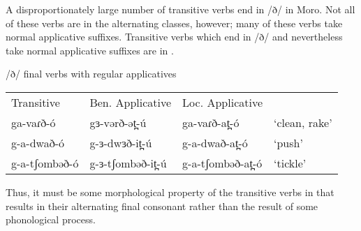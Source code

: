 
A disproportionately large number of transitive verbs end in /ð/ in Moro. Not all of these verbs are in the alternating classes, however; many of these verbs take normal applicative suffixes. Transitive verbs which end in /ð/ and nevertheless take normal applicative suffixes are in .

\ea /ð/ final verbs with regular applicatives \label{ex:ch11:tanoalt} \\
\begin{tabular}[t]{llll}
{Transitive}	& 	{Ben. Applicative} & Loc. Applicative &  \\
ga-vaɾð-ó	& gɜ-vərð-ət̪-ú & 	ga-vaɾð-at̪-ó & `clean, rake' \\
g-a-dwað-ó & g-ɜ-dwɜð-it̪-ú & g-a-dwað-at̪-ó & 	 `push' \\
g-a-tʃombəð-ó & g-ɜ-tʃombəð-it̪-ú & g-a-tʃombəð-at̪-ó & 	 `tickle' \\
\end{tabular}
\z 
Thus, it must be some morphological property of the transitive verbs in  that results in their alternating final consonant rather than the result of some phonological process.







%


%
%
%
%
%
%
%

